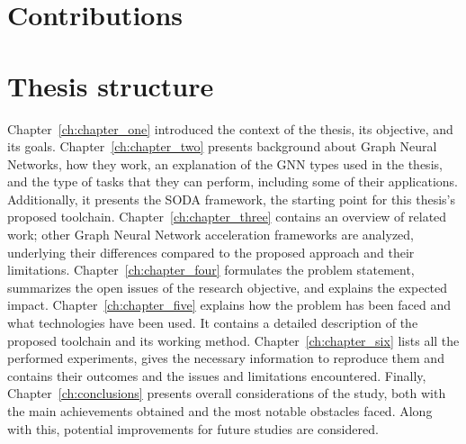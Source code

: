 \section{Contributions}
\label{sec:contributions}%


\section{Thesis structure}
\label{sec:thesis_structure}%

Chapter~\ref{ch:chapter_one} introduced the context of the thesis, its objective, and its goals.
Chapter~\ref{ch:chapter_two} presents background about Graph Neural Networks, how they work, an explanation of the GNN types used in the thesis, and the type of tasks that they can perform, including some of their applications.
Additionally, it presents the SODA framework, the starting point for this thesis's proposed toolchain.
Chapter~\ref{ch:chapter_three} contains an overview of related work; other Graph Neural Network acceleration frameworks are analyzed, underlying their differences compared to the proposed approach and their limitations.
Chapter~\ref{ch:chapter_four} formulates the problem statement, summarizes the open issues of the research objective, and explains the expected impact.
Chapter~\ref{ch:chapter_five} explains how the problem has been faced and what technologies have been used.
It contains a detailed description of the proposed toolchain and its working method.
Chapter~\ref{ch:chapter_six} lists all the performed experiments, gives the necessary information to reproduce them and contains their outcomes and the issues and limitations encountered.
Finally, Chapter~\ref{ch:conclusions} presents overall considerations of the study, both with the main achievements obtained and the most notable obstacles faced.
Along with this, potential improvements for future studies are considered.
